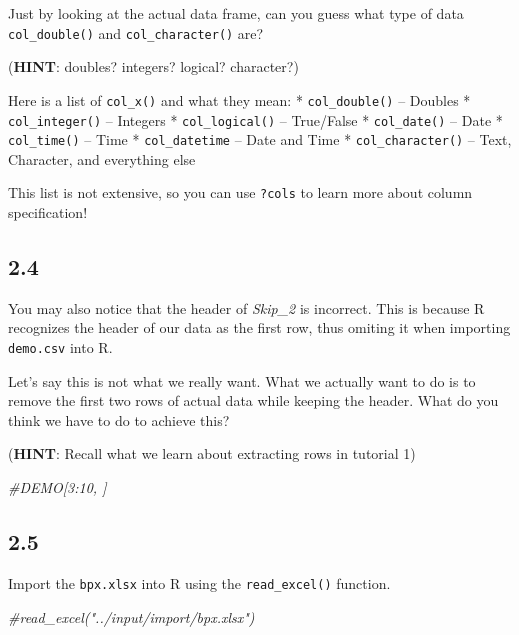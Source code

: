 \documentclass[
]{book}
\newenvironment{Shaded}{\begin{snugshade}}{\end{snugshade}}
\newcommand{\CommentTok}[1]{\textcolor[rgb]{0.56,0.35,0.01}{\textit{#1}}}
\begin{document}
Just by looking at the actual data frame, can you guess what type of data \texttt{col\_double()} and \texttt{col\_character()} are?

(\textbf{HINT}: doubles? integers? logical? character?)

Here is a list of \texttt{col\_x()} and what they mean:
* \texttt{col\_double()} -- Doubles
* \texttt{col\_integer()} -- Integers
* \texttt{col\_logical()} -- True/False
* \texttt{col\_date()} -- Date
* \texttt{col\_time()} -- Time
* \texttt{col\_datetime} -- Date and Time
* \texttt{col\_character()} -- Text, Character, and everything else

This list is not extensive, so you can use \texttt{?cols} to learn more about column specification!

\hypertarget{section-12}{%
\subsection{2.4}\label{section-12}}

You may also notice that the header of \emph{Skip\_2} is incorrect. This is because R recognizes the header of our data as the first row, thus omiting it when importing \texttt{demo.csv} into R.

Let's say this is not what we really want. What we actually want to do is to remove the first two rows of actual data while keeping the header. What do you think we have to do to achieve this?

(\textbf{HINT}: Recall what we learn about extracting rows in tutorial 1)

\begin{Shaded}
\begin{Highlighting}[]
\CommentTok{\#DEMO[3:10, ]}
\end{Highlighting}
\end{Shaded}

\hypertarget{section-13}{%
\subsection{2.5}\label{section-13}}

Import the \texttt{bpx.xlsx} into R using the \texttt{read\_excel()} function.

\begin{Shaded}
\begin{Highlighting}[]
\CommentTok{\#read\_excel("../input/import/bpx.xlsx")}
\end{Highlighting}
\end{Shaded}
\end{document}
